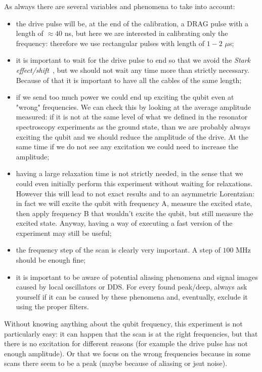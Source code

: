 As always there are several variables and phenomena to take into account:
\begin{itemize}
    \item the drive pulse will be, at the end of the calibration, a DRAG pulse with a length of $\approx 40$ ns, but here we are interested in calibrating only the frequency: therefore we use rectangular pulses with length of $1-2$ $\mu$s;
    \item it is important to wait for the drive pulse to end so that we avoid the \textit{Stark effect/shift}~\cite{Schuster2005}, but we should not wait any time more than strictly necessary. Because of that it is important to have all the cables of the same length;
    \item if we send too much power we could end up exciting the qubit even at "wrong" frequencies. We can check this by looking at the average amplitude measured: if it is not at the same level of what we defined in the resonator spectroscopy experiments as the ground state, than we are probably always exciting the qubit and we should reduce the amplitude of the drive. At the same time if we do not see any excitation we could need to increase the amplitude;
    \item having a large relaxation time is not strictly needed, in the sense that we could even initially perform this experiment without waiting for relaxations. However this will lead to not exact results and to an asymmetric Lorentzian: in fact we will excite the qubit with frequency A, measure the excited state, then apply frequency B that wouldn't excite the qubit, but still measure the excited state. Anyway, having a way of executing a fast version of the experiment may still be useful;
    \item the frequency step of the scan is clearly very important. A step of $100$ MHz should be enough fine;
    \item it is important to be aware of potential aliasing phenomena and signal images caused by local oscillators or DDS. For every found peak/deep, always ask yourself if it can be caused by these phenomena and, eventually, exclude it using the proper filters.
\end{itemize}

Without knowing anything about the qubit frequency, this experiment is not particularly easy: it can happen that the scan is at the right frequencies, but that there is no excitation for different reasons (for example the drive pulse has not enough amplitude).
Or that we focus on the wrong frequencies because in some scans there seem to be a peak (maybe because of aliasing or jsut noise).

